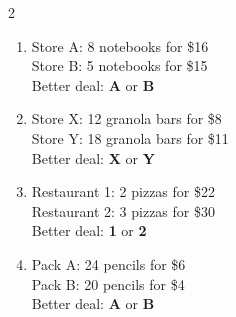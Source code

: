 \documentclass[12pt, letterpaper, fleqn]{article}
\begin{document}
\begin{multicols}{2}
\begin{enumerate}[itemsep=1.4cm, leftmargin=0.6cm]
\item Store A: 8 notebooks for \$16\\
Store B: 5 notebooks for \$15\\
Better deal: \textbf{A} or \textbf{B}

\item Store X: 12 granola bars for \$8\\
Store Y: 18 granola bars for \$11\\
Better deal: \textbf{X} or \textbf{Y}

\item Restaurant 1: 2 pizzas for \$22\\
Restaurant 2: 3 pizzas for \$30\\
Better deal: \textbf{1} or \textbf{2}

\item Pack A: 24 pencils for \$6\\
Pack B: 20 pencils for \$4\\
Better deal: \textbf{A} or \textbf{B}

\end{enumerate}
\end{multicols}
\end{document}
